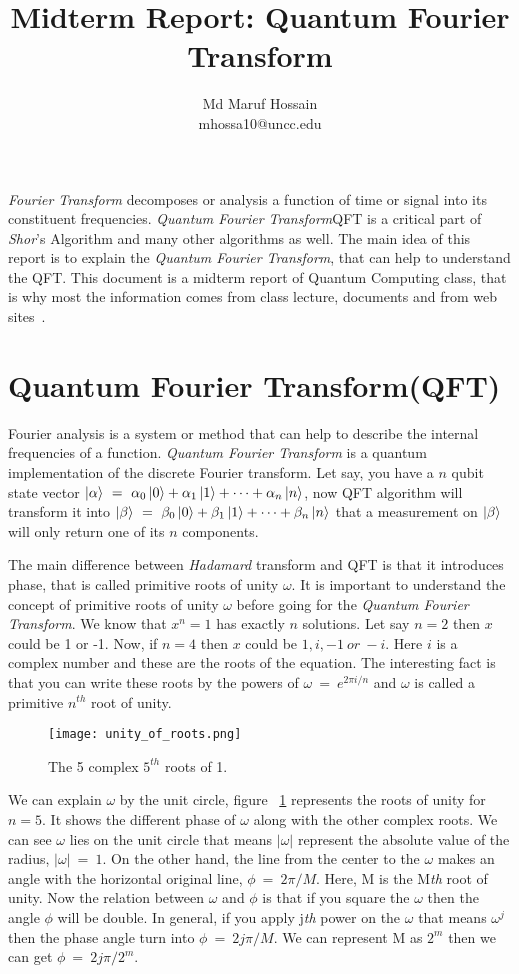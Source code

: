 \documentclass[a4paper,10pt]{article}
\title{Midterm Report: Quantum Fourier Transform}
\author[]{Md Maruf Hossain \\ mhossa10@uncc.edu}
\affil[]{Department of Computer Science, UNC Charlotte}
\date{}
\begin{document}
\maketitle
\textit{Fourier Transform} decomposes or analysis a function of time or signal into its constituent frequencies. 
\textit{Quantum Fourier Transform}{QFT} is a critical part of \textit{Shor}'s Algorithm and many other algorithms as well.
The main idea of this report is to explain the \textit{Quantum Fourier Transform}, that can help to understand the QFT. This document is a midterm report of 
Quantum Computing class, that is why most the information comes from class lecture, documents and from web sites~\cite{quantumbook}.

\section{Quantum Fourier Transform(QFT)}
Fourier analysis is a system or method that can help to describe the internal frequencies of a function. \textit{Quantum Fourier Transform} 
is a quantum implementation of the discrete Fourier transform. Let say, you have a $n$ qubit state vector $\ket{\alpha}\ =\ \alpha_0\ket{0} + 
\alpha_1\ket{1} + \cdots +\alpha_n\ket{n}$, now QFT algorithm will transform it into $\ket{\beta}\ =\ \beta_0\ket{0} + \beta_1\ket{1} + \cdots + \beta_n\ket{n}$ 
that a measurement on $\ket{\beta}$ will only return one of its $n$ components. 

The main difference between \textit{Hadamard} transform and QFT is that it introduces phase, that is called primitive roots of unity $\omega$. It is important to 
understand the concept of primitive roots of unity $\omega$ before going for the \textit{Quantum Fourier Transform}. We know that $x^n = 1$ has exactly $n$ solutions. 
Let say $n=2$ then $x$ could be 1 or -1. Now, if $n=4$ then $x$ could be $1,i,-1\ or\ -i$. Here $i$ is a complex number and these are the roots of the equation. 
The interesting fact is that you can write these roots by the powers of $\omega\ =\ e^{2\pi i/n}$ and $\omega$ is called a primitive $n^{th}$ root of unity. 
  
\begin{figure}[htp!]
  \centering
  \texttt{[image: unity\_of\_roots.png]}
  \caption{The 5 complex $5^{th}$ roots of 1.~\cite{quantumbook}}
  \label{fig:unity_of_roots}
\end{figure}

We can explain $\omega$ by the unit circle, figure ~\ref{fig:unity_of_roots} represents the roots of unity for $n=5$. It shows the different phase of $\omega$ along with 
the other complex roots. We can see $\omega$ lies on the unit circle that means $|\omega|$ represent the absolute value of the radius, $|\omega|\ =\ 1$. On the other hand, 
the line from the center to the $\omega$ makes an angle with the horizontal original line, $\phi\ =\ 2\pi/M$. Here, M is the M\textit{th} root of unity. Now the relation between 
$\omega$ and $\phi$ is that if you square the $\omega$ then the angle $\phi$ will be double. In general, if you apply j\textit{th} power on the $\omega$ that means $\omega^{j}$ 
then the phase angle turn into $\phi\ =\ 2j\pi/M$. We can represent M as $2^m$ then we can get $\phi\ =\ 2j\pi/2^m$.
\end{document}

